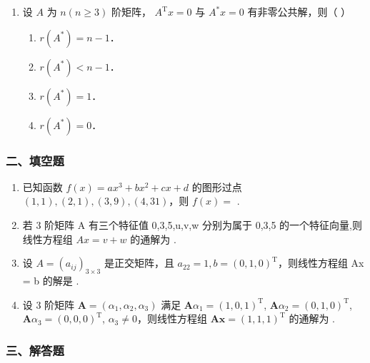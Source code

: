\documentclass[12pt, a4paper]{ctexart}
\begin{document}
\begin{enumerate}
    \item 设 $ A $ 为 $ n(n \geq 3) $ 阶矩阵， $ A^\mathrm{T}x = 0 $ 与 $ A^*x = 0 $ 有非零公共解，则（ \underline{\hspace{1cm}} ）
    \begin{enumerate}[label=(\Alph*)]
        \item $ r(A^*) = n - 1 $．
        \item $ r(A^*) < n - 1 $．
        \item $ r(A^*) = 1 $．
        \item $ r(A^*) = 0 $．
    \end{enumerate}
\end{enumerate}

\subsubsection*{二、填空题}

\begin{enumerate}[start=10]
    \item 已知函数 $ f(x)=ax^{3}+bx^{2}+cx+d $ 的图形过点 $ (1,1),(2,1),(3,9),(4,31) $，则 $ f(x)= $ \underline{\hspace{2cm}}.

    \item 若 3 阶矩阵 A 有三个特征值 0,3,5,u,v,w 分别为属于 0,3,5 的一个特征向量,则线性方程组 $ Ax = v + w $ 的通解为 \underline{\hspace{2cm}}.

    \item 设 $ A = \left( a_{ij} \right)_{3 \times 3} $ 是正交矩阵，且 $ a_{22} = 1, b = \left( 0, 1, 0 \right)^{\mathrm{T}} $，则线性方程组 Ax = b 的解是 \underline{\hspace{2cm}}.

    \item 设 3 阶矩阵 $ \mathbf{A} = (\alpha_1, \alpha_2, \alpha_3) $ 满足 $ \mathbf{A} \alpha_1 = (1, 0, 1)^{\mathrm{T}} $, $ \mathbf{A} \alpha_2 = (0, 1, 0)^{\mathrm{T}} $, $ \mathbf{A} \alpha_3 = (0, 0, 0)^{\mathrm{T}} $, $ \alpha_3 \neq 0 $，则线性方程组 $ \mathbf{A} \mathbf{x} = (1, 1, 1)^{\mathrm{T}} $ 的通解为 \underline{\hspace{2cm}}.
\end{enumerate}

\subsubsection*{三、解答题}
\end{document}

